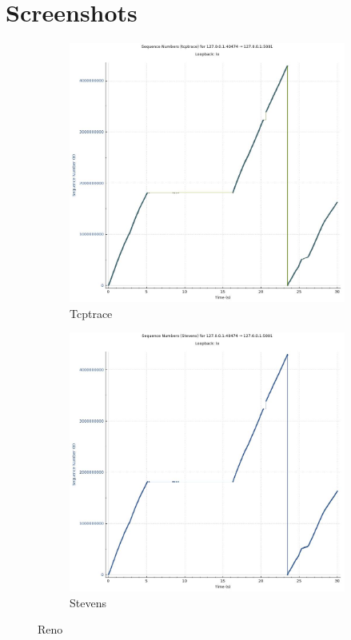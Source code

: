 \documentclass{article}
\begin{document}
\section*{Screenshots}

\begin{figure}[htp]
    \centering
    \begin{subfigure}{.5\textwidth}
        \centering
        \includegraphics[width=\linewidth]{tcptrace}
        \caption{Tcptrace}
    \end{subfigure}%
    \begin{subfigure}{.5\textwidth}
        \centering
        \includegraphics[width=\linewidth]{stevens}
        \caption{Stevens}
    \end{subfigure}
    \caption{Reno}
\end{figure}
\end{document}
